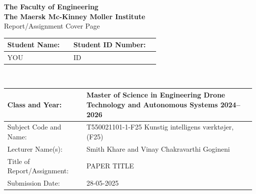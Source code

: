 \begin{titlepage}
    \begin{figure}
        \centering
    \end{figure}
    
    \vspace*{0.5cm}
    
    \centering
    \textbf{\Large The Faculty of Engineering} \\
    \textbf{\Large The Maersk Mc-Kinney Moller Institute} \\
    {\Large Report/Assignment Cover Page} \\[0.5cm]

    \begin{tabularx}{\textwidth}{|lX|lX|}
    \hline
    \textbf{Student Name:} & & \textbf{Student ID Number:} & \\
    \hline
    YOU & & ID & \\
    \hline
    \end{tabularx}\\[0.7cm]

    \begin{tabularx}{\textwidth}{|l|X|}
    \hline
    Class and Year: & Master of Science in Engineering Drone Technology and Autonomous Systems 2024--2026 \\
    \hline
    Subject Code and Name: & T550021101-1-F25 Kunstig intelligens værktøjer, (F25) \\
    \hline
    Lecturer Name(s): & Smith Khare and Vinay Chakravarthi Gogineni \\
    \hline
    Title of Report/Assignment: & PAPER TITLE \\
    \hline
    Submission Date: & 28-05-2025 \\
    \hline
    \end{tabularx}\\[1cm]
    

\end{titlepage}
